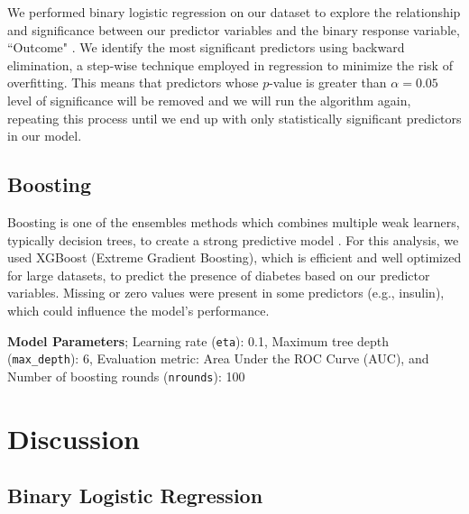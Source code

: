 \documentclass[12pt]{article}
\begin{document}
\begin{indent}
\onehalfspacing
	
We performed binary logistic regression on our dataset to explore the relationship and significance between our predictor variables and the binary response variable, “Outcome" \citep{faraway2016extending}. We identify the most significant predictors using backward elimination, a step-wise technique employed in regression to minimize the risk of overfitting. This means that predictors whose $p$-value is greater than $\alpha = 0.05$ level of significance will be removed and we will run the algorithm again, repeating this process until we end up with only statistically significant predictors in our model.
\end{indent}

\subsection{Boosting}

\begin{indent}
\onehalfspacing
	
Boosting is one of the ensembles methods which combines multiple weak learners, typically decision trees, to create a strong predictive model \citep{chen2015xgboost,friedman2001greedy}. For this analysis, we used XGBoost (Extreme Gradient Boosting), which is efficient and well optimized for large datasets, to predict the presence of diabetes based on our predictor variables. Missing or zero values were present in some predictors (e.g., insulin), which could influence the model's performance.
\end{indent}

\textbf{Model Parameters}; Learning rate (\texttt{eta}): 0.1, Maximum tree depth (\texttt{max\_depth}): 6, Evaluation metric: Area Under the ROC Curve (AUC), and Number of boosting rounds (\texttt{nrounds}): 100

\section{Discussion}
\subsection{Binary Logistic Regression}
\end{document}

